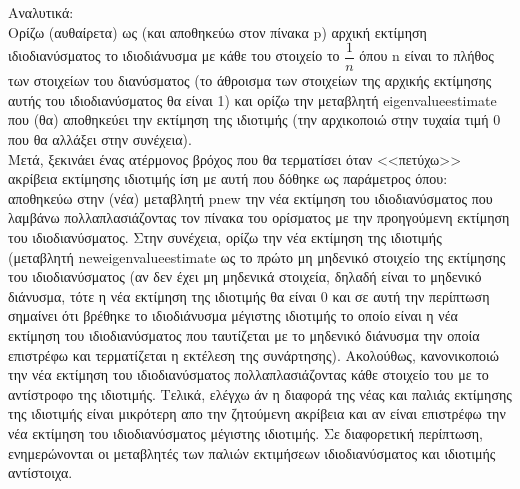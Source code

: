 \documentclass[a4paper,11pt]{article}
\newcommand{\lt}{\latintext}
\begin{document}
\par
Αναλυτικά:\\
Ορίζω (αυθαίρετα) ως (και αποθηκεύω στον πίνακα {\lt p}) αρχική εκτίμηση ιδιοδιανύσματος το ιδιοδιάνυσμα με κάθε του στοιχείο το {\lt $\dfrac{1}{n}$} όπου {\lt n} είναι το πλήθος των στοιχείων του διανύσματος (το άθροισμα των στοιχείων της αρχικής εκτίμησης αυτής του ιδιοδιανύσματος θα είναι 1) και ορίζω την μεταβλητή {\lt eigenvalue\textunderscore estimate} που (θα) αποθηκεύει την εκτίμηση της ιδιοτιμής (την αρχικοποιώ στην τυχαία τιμή 0 που θα αλλάξει στην συνέχεια).\\
Μετά, ξεκινάει ένας ατέρμονος βρόχος που θα τερματίσει όταν <<πετύχω>> ακρίβεια εκτίμησης ιδιοτιμής ίση με αυτή που δόθηκε ως παράμετρος όπου:\\
αποθηκεύω στην (νέα) μεταβλητή {\lt p\textunderscore new} την νέα εκτίμηση του ιδιοδιανύσματος που λαμβάνω πολλαπλασιάζοντας τον πίνακα του ορίσματος με την προηγούμενη εκτίμηση του ιδιοδιανύσματος. Στην συνέχεια, ορίζω την νέα εκτίμηση της ιδιοτιμής (μεταβλητή {\lt new\textunderscore eigenvalue\textunderscore estimate} ως το πρώτο μη μηδενικό στοιχείο της εκτίμησης του ιδιοδιανύσματος (αν δεν έχει μη μηδενικά στοιχεία, δηλαδή είναι το μηδενικό διάνυσμα, τότε η νέα εκτίμηση της ιδιοτιμής θα είναι 0 και σε αυτή την περίπτωση σημαίνει ότι βρέθηκε το ιδιοδιάνυσμα μέγιστης ιδιοτιμής το οποίο είναι η νέα εκτίμηση του ιδιοδιανύσματος που ταυτίζεται με το μηδενικό διάνυσμα την οποία επιστρέφω και τερματίζεται η εκτέλεση της συνάρτησης). Ακολούθως, κανονικοποιώ την νέα εκτίμηση του ιδιοδιανύσματος πολλαπλασιάζοντας κάθε στοιχείο του με το αντίστροφο της ιδιοτιμής. Τελικά, ελέγχω άν η διαφορά της νέας και παλιάς εκτίμησης της ιδιοτιμής είναι μικρότερη απο την ζητούμενη ακρίβεια και αν είναι επιστρέφω την νέα εκτίμηση του ιδιοδιανύσματος μέγιστης ιδιοτιμής. Σε διαφορετική περίπτωση, ενημερώνονται οι μεταβλητές των παλιών εκτιμήσεων ιδιοδιανύσματος και ιδιοτιμής αντίστοιχα.\\
\end{document}
